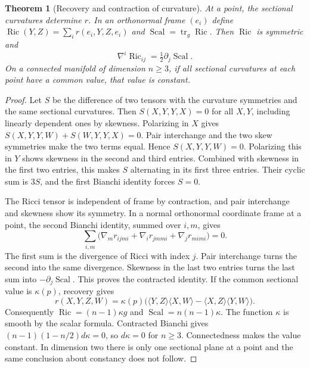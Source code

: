\documentclass[11pt,oneside,openany]{book}
\theoremstyle{plain}
\newtheorem{theorem}{Theorem}[chapter]
\theoremstyle{definition}
\theoremstyle{remark}
\begin{document}
\begin{theorem}[Recovery and contraction of curvature]
\label{thm:p202-sectional-recovery}
At a point, the sectional curvatures determine \(r\).
In an orthonormal frame \((e_i)\) define
\(\operatorname{Ric}(Y,Z)=\sum_i r(e_i,Y,Z,e_i)\) and
\(\operatorname{Scal}=\operatorname{tr}_g\operatorname{Ric}\).
Then \(\operatorname{Ric}\) is symmetric and
\[
   \nabla^i\operatorname{Ric}_{ij}=\tfrac12\partial_j\operatorname{Scal}.
\]
On a connected manifold of dimension \(n\ge3\), if all sectional
curvatures at each point have a common value, that value is constant.
\end{theorem}

\begin{proof}
Let \(S\) be the difference of two tensors with the curvature
symmetries and the same sectional curvatures.
Then \(S(X,Y,Y,X)=0\) for all \(X,Y\), including linearly dependent
ones by skewness. Polarizing in \(X\) gives
\(S(X,Y,Y,W)+S(W,Y,Y,X)=0\). Pair interchange and the two
skew symmetries make the two terms equal. Hence
\(S(X,Y,Y,W)=0\). Polarizing this in \(Y\) shows skewness in
the second and third entries. Combined with skewness in the first
two entries, this makes \(S\) alternating in its first three
entries. Their cyclic sum is \(3S\), and the first Bianchi identity
forces \(S=0\).

The Ricci tensor is independent of frame by contraction, and pair
interchange and skewness show its symmetry. In a normal orthonormal
coordinate frame at a point, the second Bianchi identity, summed
over \(i,m\), gives
\[
 \sum_{i,m}\bigl(\nabla_m r_{ijmi}
           +\nabla_i r_{jmmi}+\nabla_j r_{mimi}\bigr)=0 .
\]
The first sum is the divergence of Ricci with index \(j\).
Pair interchange turns the second into the same divergence.
Skewness in the last two entries turns the last sum into
\(-\partial_j\operatorname{Scal}\).
This proves the contracted identity.
If the common sectional value is \(\kappa(p)\), recovery gives
\[
 r(X,Y,Z,W)=\kappa(p)
     \bigl(\langle Y,Z\rangle\langle X,W\rangle
                         -\langle X,Z\rangle\langle Y,W\rangle\bigr).
\]
Consequently \(\operatorname{Ric}=(n-1)\kappa g\) and
\(\operatorname{Scal}=n(n-1)\kappa\). The function \(\kappa\) is
smooth by the scalar formula. Contracted Bianchi gives
\((n-1)(1-n/2)d\kappa=0\), so \(d\kappa=0\) for \(n\ge3\).
Connectedness makes the value constant.
In dimension two there is only one sectional plane at a point
and the same conclusion about constancy does not follow.
\end{proof}
\end{document}
